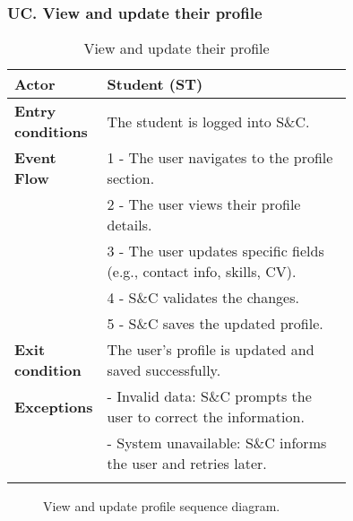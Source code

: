 \subsubsection*{UC\cuc . View and update their profile}
\begin{center}
    \begin{longtable}{|l|p{0.75\linewidth}|}
        \hline
        \textbf{Actor}            & Student (ST) \\
        \hline
        \textbf{Entry conditions} & The student is logged into S\&C. \\
        \hline
        \textbf{Event Flow}       & 1 - The user navigates to the profile section. \\
        & 2 - The user views their profile details. \\
        & 3 - The user updates specific fields (e.g., contact info, skills, CV). \\
        & 4 - S\&C validates the changes. \\
        & 5 - S\&C saves the updated profile. \\
        \hline
        \textbf{Exit condition}   & The user's profile is updated and saved successfully. \\       
        \hline
        \textbf{Exceptions}       & - Invalid data: S\&C prompts the user to correct the information. \\
                                  & - System unavailable: S\&C informs the user and retries later. \\
        \hline
        \caption{View and update their profile}
        \label{tab:view_update_profile_usecase}
    \end{longtable}
\end{center}

\begin{figure}[H]
    \begin{center}
        
        \caption{View and update profile sequence diagram.}
        \label{fig:view_update_profile_seqd}%
    \end{center}
\end{figure}

